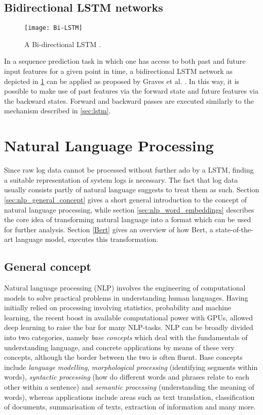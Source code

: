 \subsection{Bidirectional LSTM networks \label{sec:bi-lstm}}
\begin{figure}[h]
  \centering
  \texttt{[image: Bi-LSTM]} \\
  \caption{A Bi-directional LSTM \cite{graves2013speech}.}
  \label{fig:bi-lstm}
\end{figure}
In a sequence prediction task in which one has access to both past and future input features for a given point in time, a bidirectional LSTM network as depicted in \ref{fig:bi-lstm} can be applied as proposed by Graves et al. \cite{graves2013speech}. In this way, it is possible to make use of past features via the forward state and future features via the backward states. Forward and backward passes are executed similarly to the mechanism described in \ref{sec:lstm}.




\section{Natural Language Processing \label{sec:natural-language-processing}}
Since raw log data cannot be processed without further ado by a LSTM, finding a suitable representation of system logs is necessary. The fact that log data usually consists partly of natural language suggests to treat them as such. Section \ref{sec:nlp_general_concept} gives a short general introduction to the concept of natural language processing, while section \ref{sec:nlp_word_embeddings} describes the core idea of transforming natural language into a format which can be used for further analysis. Section \ref{Bert} gives an overview of how Bert, a state-of-the-art language model, executes this transformation.

\subsection{General concept \label{sec:nlp_general_concept}}
Natural language processing (NLP) involves the engineering of computational models to solve practical problems in understanding human languages. Having initially relied on processing involving statistics, probability and machine learning, the recent boost in available computational power with GPUs, allowed deep learning to raise the bar for many NLP-tasks. NLP can be broadly divided into two categories, namely \textit{base concepts} which deal with the fundamentals of understanding language, and concrete applications by means of these very concepts, although the border between the two is often fluent. Base concepts include \textit{language modelling}, \textit{morphological processing} (identifying segments within words), \textit{syntactic processing} (how do different words and phrases relate to each other within a sentence) and \textit{semantic processing} (understanding the meaning of words), whereas applications include areas such as text translation, classification of documents, summarisation of texts, extraction of information and many more.
